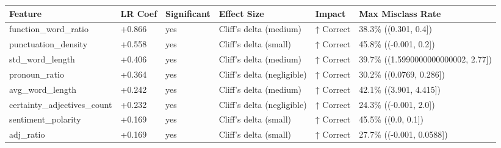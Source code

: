 \begin{tabular}{llllll}
\toprule
Feature & LR Coef & Significant & Effect Size & Impact & Max Misclass Rate \\
\midrule
function\_word\_ratio & +0.866 & yes & Cliff's delta (medium) & ↑ Correct & 38.3\% ((0.301, 0.4]) \\
punctuation\_density & +0.558 & yes & Cliff's delta (small) & ↑ Correct & 45.8\% ((-0.001, 0.2]) \\
std\_word\_length & +0.406 & yes & Cliff's delta (medium) & ↑ Correct & 39.7\% ((1.5990000000000002, 2.77]) \\
pronoun\_ratio & +0.364 & yes & Cliff's delta (negligible) & ↑ Correct & 30.2\% ((0.0769, 0.286]) \\
avg\_word\_length & +0.242 & yes & Cliff's delta (medium) & ↑ Correct & 42.1\% ((3.901, 4.415]) \\
certainty\_adjectives\_count & +0.232 & yes & Cliff's delta (negligible) & ↑ Correct & 24.3\% ((-0.001, 2.0]) \\
sentiment\_polarity & +0.169 & yes & Cliff's delta (small) & ↑ Correct & 45.5\% ((0.0, 0.1]) \\
adj\_ratio & +0.169 & yes & Cliff's delta (small) & ↑ Correct & 27.7\% ((-0.001, 0.0588]) \\
\bottomrule
\end{tabular}
